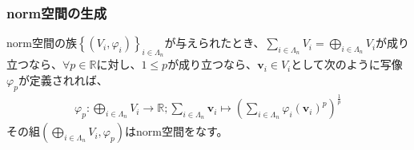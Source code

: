 \documentclass[dvipdfmx]{jsarticle}
\begin{document}
\subsubsection{norm空間の生成}%
\begin{thm}\label{2.3.1.10}
norm空間の族$\left\{ \left( V_{i},\varphi_{i} \right) \right\}_{i \in \varLambda_{n}}$が与えられたとき、$\sum_{i \in \varLambda_{n}} V_{i} = \bigoplus_{i \in \varLambda_{n}} V_{i}$が成り立つなら、$\forall p \in \mathbb{R}$に対し、$1 \leq p$が成り立つなら、$\mathbf{v}_{i} \in V_{i}$として次のように写像$\varphi_{p}$が定義されれば、
\begin{align*}
\varphi_{p}:\bigoplus_{i \in \varLambda_{n}} V_{i} \rightarrow \mathbb{R};\sum_{i \in \varLambda_{n}} \mathbf{v}_{i} \mapsto \left( \sum_{i \in \varLambda_{n}} {\varphi_{i}\left( \mathbf{v}_{i} \right)}^{p} \right)^{\frac{1}{p}}
\end{align*}
その組$\left( \bigoplus_{i \in \varLambda_{n}} V_{i},\varphi_{p} \right)$はnorm空間をなす。
\end{thm}
\end{document}
